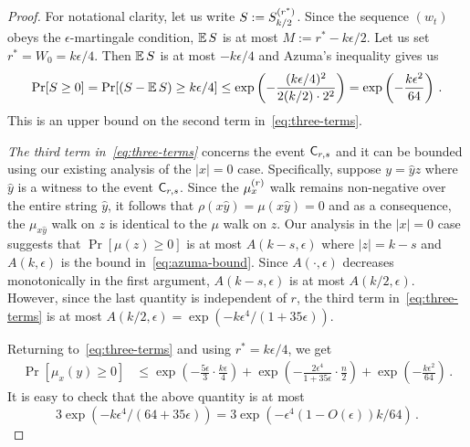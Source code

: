 \begin{proof}
For notational clarity, let us write $S := S^{(r^*)}_{k/2}$. 
Since the sequence $(w_t)$ obeys the $\epsilon$-martingale condition, 
$\operatorname{\mathbb{E}} S$ is at most $M := r^* - k\epsilon/2$. 
Let us set $r^* = W_0 = k\epsilon/4$. Then $\operatorname{\mathbb{E}} S$ is at most $-k\epsilon/4$ and Azuma's inequality gives us
\[
\Pr[S \geq 0] 
= \Pr[(S - \operatorname{\mathbb{E}} S) \geq k\epsilon/4] 
\leq \exp\left( - \frac{(k\epsilon/4)^2}{2(k/2)\cdot 2^2}\right) 
= \exp\left( -\frac{k \epsilon^2}{64} \right)
\, .
\]
This is an upper bound on the second term in~\eqref{eq:three-terms}.

\emph{The third term in~\eqref{eq:three-terms}} concerns the event $\mathsf{C}_{r,s}$ and it can be bounded using 
our existing analysis of the $|x|=0$ case. 
Specifically, suppose $y = \hat{y} z$ where
$\hat{y}$ is a witness to the event $\mathsf{C}_{r,s}$. 
Since the $\mu_x^{(r)}$ walk remains non-negative over the entire string $\hat{y}$, 
it follows that $\rho(x\hat{y}) = \mu(x\hat{y}) = 0$ 
and as a consequence, the $\mu_{x\hat{y}}$ walk on $z$ is identical to 
the $\mu$ walk on $z$. 
Our analysis in the $|x| = 0$ case suggests that 
$\Pr[\mu(z) \geq 0]$ is at most $A(k-s, \epsilon)$ 
where $|z| = k - s$ and $A(k, \epsilon)$ is the bound in~\eqref{eq:azuma-bound}. 
Since $A(\cdot,\epsilon)$ decreases monotonically in the first argument, 
$A(k-s, \epsilon)$ is at most $A(k/2, \epsilon)$. 
However, since the last quantity is independent of $r$, 
the third term in~\eqref{eq:three-terms} is at most 
$A(k/2, \epsilon) = \exp\left( -k \epsilon^4/(1+35\epsilon) \right)$. 


Returning to~\eqref{eq:three-terms} and using $r^* = k\epsilon/4$, we get
\begin{align*}
\Pr[\mu_x(y) \geq 0] 
 &\leq    \exp\left(-\frac{5 \epsilon}{3} \cdot \frac{k\epsilon}{4} \right)  
        + \exp\left(-\frac{2\epsilon^4}{1 + 35\epsilon} \cdot \frac{n}{2}\right)
        + \exp\left( -\frac{k \epsilon^2}{64} \right)
\, .
\end{align*}
It is easy to check that the above quantity is at most
$$
  3 \exp\left( - k \epsilon^4/(64 + 35 \epsilon) \right) 
= 3 \exp\left( - \epsilon^4 (1 - O(\epsilon) ) k/64 \right)
\,.
$$

\end{proof}
